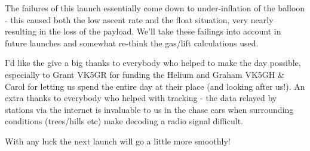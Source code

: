 \documentclass[a4paper,12pt]{article}
\begin{document}
\begin{appendices}
The failures of this launch essentially come down to under-inflation of the balloon - this caused both the low ascent rate and the float situation, very nearly resulting in the loss of the payload. We'll take these failings into account in future launches and somewhat re-think the gas/lift calculations used.

I'd like the give a big thanks to everybody who helped to make the day possible, especially to Grant VK5GR for funding the Helium and Graham VK5GH \& Carol for letting us spend the entire day at their place (and looking after us!). An extra thanks to everybody who helped with tracking - the data relayed by stations via the internet is invaluable to us in the chase cars when surrounding conditions (trees/hills etc) make decoding a radio signal difficult.

With any luck the next launch will go a little more smoothly! 

\end{appendices}
\end{document}
